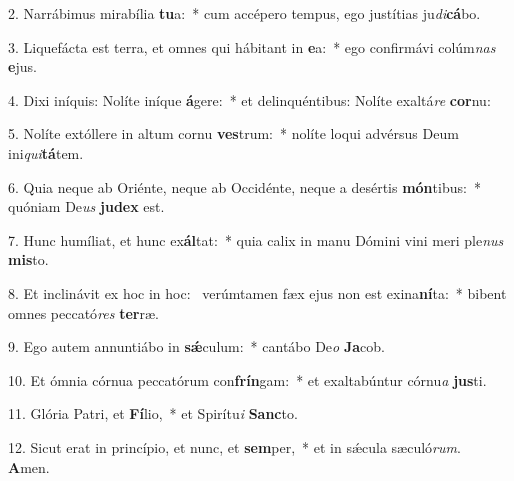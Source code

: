 2. Narrábimus mirabília \textbf{tu}a:~*  cum accépero tempus, ego justítias ju\textit{di}\textbf{cá}bo.\

3. Liquefácta est terra, et omnes qui hábitant in \textbf{e}a:~*  ego confirmávi colúm\textit{nas} \textbf{e}jus.\

4. Dixi iníquis: Nolíte iníque \textbf{á}gere:~*  et delinquéntibus: Nolíte exaltá\textit{re} \textbf{cor}nu:\

5. Nolíte extóllere in altum cornu \textbf{ves}trum:~*  nolíte loqui advérsus Deum ini\textit{qui}\textbf{tá}tem.\

6. Quia neque ab Oriénte, neque ab Occidénte, neque a desértis \textbf{món}tibus:~*  quóniam De\textit{us} \textbf{ju}\textbf{dex} est.\

7. Hunc humíliat, et hunc ex\textbf{ál}tat:~*  quia calix in manu Dómini vini meri ple\textit{nus} \textbf{mis}to.\

8. Et inclinávit ex hoc in hoc: \dag\  verúmtamen fæx ejus non est exina\textbf{ní}ta:~*  bibent omnes peccató\textit{res} \textbf{ter}ræ.\

9. Ego autem annuntiábo in \textbf{sǽ}culum:~*  cantábo De\textit{o} \textbf{Ja}cob.\

10. Et ómnia córnua peccatórum con\textbf{frín}gam:~*  et exaltabúntur córnu\textit{a} \textbf{jus}ti.\

11. Glória Patri, et \textbf{Fí}lio,~*  et Spirítu\textit{i} \textbf{Sanc}to.\

12. Sicut erat in princípio, et nunc, et \textbf{sem}per,~*  et in sǽcula sæculó\textit{rum}. \textbf{A}men.\

